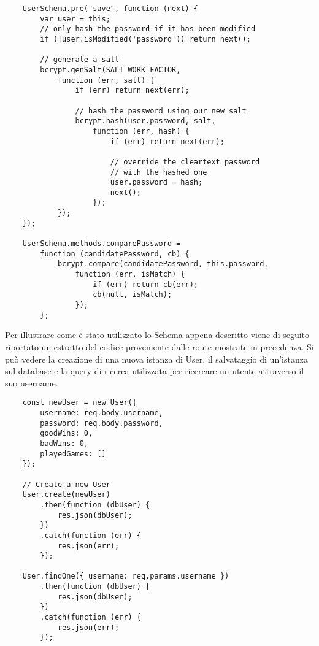 \begin{verbatim}
    UserSchema.pre("save", function (next) {
        var user = this;
        // only hash the password if it has been modified
        if (!user.isModified('password')) return next();
    
        // generate a salt
        bcrypt.genSalt(SALT_WORK_FACTOR,
            function (err, salt) {
                if (err) return next(err);
        
                // hash the password using our new salt
                bcrypt.hash(user.password, salt,
                    function (err, hash) {
                        if (err) return next(err);
            
                        // override the cleartext password
                        // with the hashed one
                        user.password = hash;
                        next();
                    });
            });
    });
    
    UserSchema.methods.comparePassword = 
        function (candidatePassword, cb) {
            bcrypt.compare(candidatePassword, this.password,
                function (err, isMatch) {
                    if (err) return cb(err);
                    cb(null, isMatch);
                });
        };
\end{verbatim}

Per illustrare come è stato utilizzato lo Schema appena descritto viene di seguito riportato un estratto del codice proveniente dalle route mostrate in precedenza. Si può vedere la creazione di una nuova istanza di User, il salvataggio di un'istanza sul database e la query di ricerca utilizzata per ricercare un utente attraverso il suo username.

\begin{verbatim}
    const newUser = new User({
        username: req.body.username,
        password: req.body.password,
        goodWins: 0,
        badWins: 0,
        playedGames: []
    });
    
    // Create a new User
    User.create(newUser)
        .then(function (dbUser) {
            res.json(dbUser);
        })
        .catch(function (err) {
            res.json(err);
        });

    User.findOne({ username: req.params.username })
        .then(function (dbUser) {
            res.json(dbUser);
        })
        .catch(function (err) {
            res.json(err);
        });
\end{verbatim}

